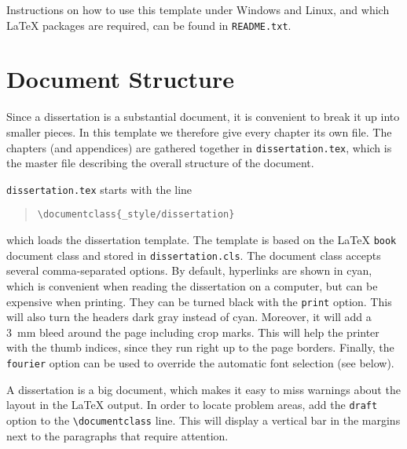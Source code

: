\begin{refsection}
Instructions on how to use this template under Windows and Linux, and which \LaTeX{} packages are required, can be found in \texttt{README.txt}.

\section{Document Structure}
\dropcap S{ince} a dissertation is a substantial document, it is convenient to break it up into smaller pieces. In this template we therefore give every chapter its own file. The chapters (and appendices) are gathered together in \texttt{dissertation.tex}, which is the master file describing the overall structure of the document.

\mbox{\texttt{dissertation.tex}} starts with the line

\begin{quote}
\verb|\documentclass{_style/dissertation}|
\end{quote}
which loads the dissertation template. The template is based on the \LaTeX{} \texttt{book} document class and stored in \texttt{dissertation.cls}. The document class accepts several comma-separated options. By default, hyperlinks are shown in cyan, which is convenient when reading the dissertation on a computer, but can be expensive when printing. They can be turned black with the \texttt{print} option. This will also turn the headers dark gray instead of cyan. Moreover, it will add a 3~mm bleed around the page including crop marks. This will help the printer with the thumb indices, since they run right up to the page borders. Finally, the \texttt{fourier} option can be used to override the automatic font selection (see below).

A dissertation is a big document, which makes it easy to miss warnings about the layout in the \LaTeX{} output. In order to locate problem areas, add the \texttt{draft} option to the \verb|\documentclass| line. This will display a vertical bar in the margins next to the paragraphs that require attention.


\end{refsection}
